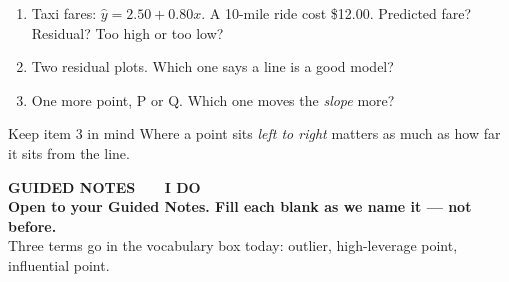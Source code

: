 \documentclass[aspectratio=169, 11pt]{beamer}
\begin{document}
\begin{frame}[t, plain]
  \begin{enumerate}\setlength{\itemsep}{8pt}
    \item Taxi fares: $\hat{y} = 2.50 + 0.80x$. A 10-mile ride cost \$12.00. Predicted fare?
          Residual? Too high or too low?
    \item Two residual plots. Which one says a line is a good model?
    \item One more point, P or Q. Which one moves the \emph{slope} more?
  \end{enumerate}
  \vspace{6pt}
  \begin{block}{Keep item 3 in mind}
    Where a point sits \emph{left to right} matters as much as how far it sits from the line.
  \end{block}
\end{frame}

{
\begin{frame}[plain]
  \vspace{1.8cm}\hspace{0.8cm}%
  \begin{minipage}{0.86\textwidth}
    {\color{goldacc}\bfseries\small GUIDED NOTES \ \textbullet\ \ I DO}\\[0.7cm]
    {\color{white}\bfseries\Large Open to your Guided Notes. Fill each blank as we name it
    --- not before.}\\[0.9cm]
    {\color{skymid}\small Three terms go in the vocabulary box today: outlier, high-leverage
    point, influential point.}
  \end{minipage}
\end{frame}
}
\end{document}
